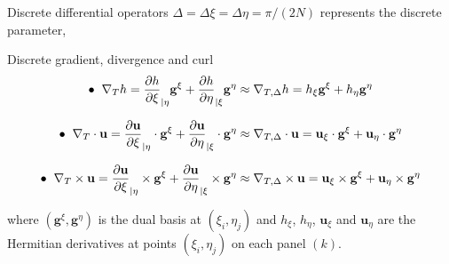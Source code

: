 \documentclass[11pt]{beamer}
\begin{document}

\begin{frame}{Discrete differential operators}
$\Delta = \Delta \xi = \Delta \eta = \pi / (2N)$ represents the discrete parameter,
\begin{block}{Discrete gradient, divergence and curl}
$$
\bullet \hspace{0.2cm} \nabla_{T}h=\frac{\partial h}{\partial\xi}_{|\eta}\mathbf{g}^{\xi}
+\frac{\partial h}{\partial\eta}_{|\xi}\mathbf{g}^{\eta} \approx \nabla_{T,\Delta} h=h_{\xi}\mathbf{g}^{\xi}
+h_{\eta} \mathbf{g}^{\eta}
$$

$$
\bullet \hspace{0.2cm} \nabla_{T} \cdot \mathbf{u}=\frac{\partial \mathbf{u}}{\partial\xi}_{|\eta} \cdot \mathbf{g}^{\xi}
+\frac{\partial \mathbf{u}}{\partial\eta}_{|\xi} \cdot \mathbf{g}^{\eta} \approx \nabla_{T,\Delta} \cdot \mathbf{u}=\mathbf{u}_{\xi} \cdot \mathbf{g}^{\xi}
+\mathbf{u}_{\eta} \cdot \mathbf{g}^{\eta}
$$

$$
\bullet \hspace{0.2cm} \nabla_{T} \times \mathbf{u}=\frac{\partial \mathbf{u}}{\partial\xi}_{|\eta} \times \mathbf{g}^{\xi}
+\frac{\partial \mathbf{u}}{\partial\eta}_{|\xi} \times \mathbf{g}^{\eta} \approx \nabla_{T,\Delta} \times \mathbf{u}=\mathbf{u}_{\xi} \times \mathbf{g}^{\xi}
+\mathbf{u}_{\eta} \times \mathbf{g}^{\eta}
$$

where $(\mathbf{g}^{\xi},\mathbf{g}^{\eta})$ is the dual basis at $(\xi_i, \eta_j)$ and $h_{\xi}$, $h_{\eta}$, $\mathbf{u}_{\xi}$ and $\mathbf{u}_{\eta}$ are the Hermitian derivatives at points $(\xi_i, \eta_j)$ on each panel $(k)$.
\end{block}
\end{frame}

\end{document}
